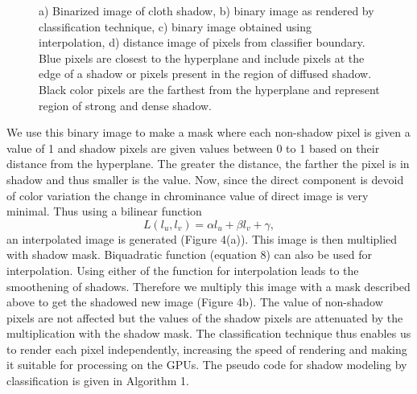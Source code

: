 \begin{figure}[h]
{\label{fig:subfig3} }   \caption{a) Binarized image of cloth shadow, b) binary
image as rendered by classification technique, c) binary image obtained using
interpolation, d) distance image of pixels from classifier boundary. Blue pixels
are closest to the hyperplane and include pixels at the edge of a shadow or
pixels present in the region of diffused shadow. Black color pixels are the
farthest from the hyperplane and represent region of strong and dense shadow.}
\label{fig:subfigureExample}
\end{figure}

We use this binary image to make  a mask where each non-shadow pixel is given a
value of 1 and shadow pixels are given values between 0 to 1 based on their
distance from the hyperplane. The greater the distance, the farther the pixel is
in shadow and thus smaller is the value. Now, since the direct component is
devoid of color variation the change in chrominance value of direct image is
very minimal. Thus using a bilinear function
\begin{equation}
L(l_u,l_v) = \alpha l_u + \beta l_v +\gamma,
\end{equation}
an interpolated image is generated (Figure 4(a)). This image is then multiplied
with shadow mask. Biquadratic function (equation 8) can also be used for
interpolation. Using either of the function for interpolation leads to the
smoothening of shadows. Therefore we multiply this image with a mask described
above to get the shadowed new image (Figure 4b). The value of non-shadow pixels
are not affected but the values of the shadow pixels are attenuated by the
multiplication with the shadow mask. The classification technique thus enables
us to render each pixel independently, increasing the speed of rendering and
making it suitable for processing on the GPUs. The pseudo code for shadow modeling by
classification is given in Algorithm 1.

